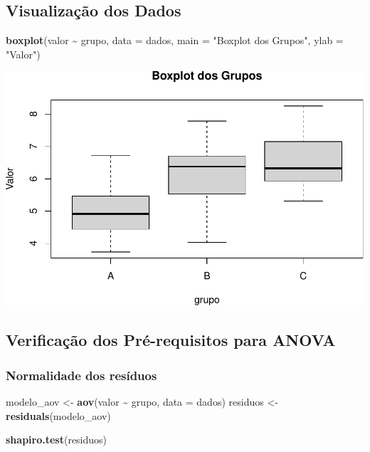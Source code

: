 \documentclass[
]{book}
\newenvironment{Shaded}{\begin{snugshade}}{\end{snugshade}}
\newcommand{\AttributeTok}[1]{\textcolor[rgb]{0.13,0.29,0.53}{#1}}
\newcommand{\FunctionTok}[1]{\textcolor[rgb]{0.13,0.29,0.53}{\textbf{#1}}}
\newcommand{\NormalTok}[1]{#1}
\newcommand{\OtherTok}[1]{\textcolor[rgb]{0.56,0.35,0.01}{#1}}
\newcommand{\SpecialCharTok}[1]{\textcolor[rgb]{0.81,0.36,0.00}{\textbf{#1}}}
\newcommand{\StringTok}[1]{\textcolor[rgb]{0.31,0.60,0.02}{#1}}
\begin{document}
\subsection{Visualização dos Dados}\label{visualizauxe7uxe3o-dos-dados}

\begin{Shaded}
\begin{Highlighting}[]
\FunctionTok{boxplot}\NormalTok{(valor }\SpecialCharTok{\textasciitilde{}}\NormalTok{ grupo, }\AttributeTok{data =}\NormalTok{ dados, }\AttributeTok{main =} \StringTok{"Boxplot dos Grupos"}\NormalTok{, }\AttributeTok{ylab =} \StringTok{"Valor"}\NormalTok{)}
\end{Highlighting}
\end{Shaded}

\includegraphics{LivroEstatisticaR_files/figure-latex/boxplotAnovabp-1.pdf}

\subsection{Verificação dos Pré-requisitos para ANOVA}\label{verificauxe7uxe3o-dos-pruxe9-requisitos-para-anova}

\subsubsection{Normalidade dos resíduos}\label{normalidade-dos-resuxedduos}

\begin{Shaded}
\begin{Highlighting}[]
\NormalTok{modelo\_aov }\OtherTok{\textless{}{-}} \FunctionTok{aov}\NormalTok{(valor }\SpecialCharTok{\textasciitilde{}}\NormalTok{ grupo, }\AttributeTok{data =}\NormalTok{ dados)}
\NormalTok{residuos }\OtherTok{\textless{}{-}} \FunctionTok{residuals}\NormalTok{(modelo\_aov)}

\FunctionTok{shapiro.test}\NormalTok{(residuos)}
\end{Highlighting}
\end{Shaded}
\end{document}
